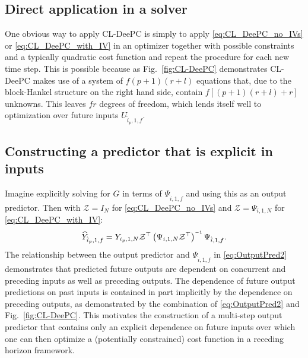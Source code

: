 %
\subsection{Direct application in a solver}
One obvious way to apply \ac{CL-DeePC} is simply to apply \eqref{eq:CL_DeePC_no_IVs} or \eqref{eq:CL_DeePC_with_IV} in an optimizer together with possible constraints and a typically quadratic cost function and repeat the procedure for each new time step. This is possible because as Fig.~\ref{fig:CL-DeePC} demonstrates \ac{CL-DeePC} makes use of a system of $f(p+1)(r+l)$ equations that, due to the block-Hankel structure on the right hand side, contain $f[(p+1)(r+l)+r]$ unknowns. %
This leaves $fr$ degrees of freedom, which lends itself well to optimization over future inputs $U_{\hat{i}_p,1,f}$.
%
\subsection{Constructing a predictor that is explicit in inputs}
Imagine explicitly solving for $G$ in terms of $\Psi_{\hat{i},1,f}$ and using this as an output predictor. Then with $\mathcal{Z}=I_N$ for \eqref{eq:CL_DeePC_no_IVs} and $\mathcal{Z}=\Psi_{i,1,N}$ for \eqref{eq:CL_DeePC_with_IV}:
\begin{align}\label{eq:OutputPred2}
     \widehat{Y}_{\hat{i}_p,1,f} = Y_{i_p,1,N}{\mathcal{Z}}^\top \left(\Psi_{i,1,N}{\mathcal{Z}}^\top\right)\inv\Psi_{\hat{i},1,f}.
\end{align}
The relationship between the output predictor and $\Psi_{\hat{i},1,f}$ in \eqref{eq:OutputPred2} demonstrates that predicted future outputs are dependent on concurrent and preceding inputs as well as preceding outputs. The dependence of future output predictions on past inputs is contained in part implicitly by the dependence on preceding outputs, as demonstrated by the combination of \eqref{eq:OutputPred2} and Fig.~\ref{fig:CL-DeePC}. This motivates the construction of a multi-step output predictor that contains only an explicit dependence on future inputs over which one can then optimize a (potentially constrained) cost function in a receding horizon framework.
